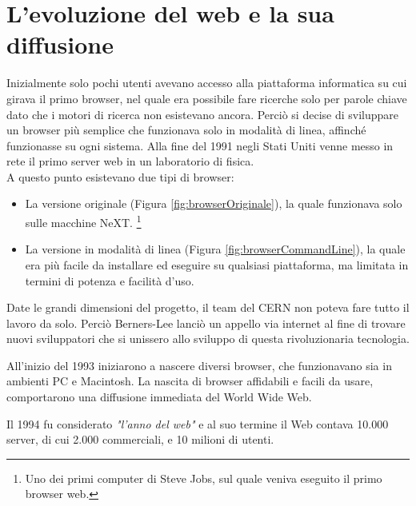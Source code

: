 \section{L'evoluzione del web e la sua diffusione}
Inizialmente solo pochi utenti avevano accesso alla piattaforma informatica su cui girava il primo browser, nel quale era possibile fare ricerche solo per parole chiave dato che i motori di ricerca non esistevano ancora. Perciò si decise di sviluppare un browser più semplice che funzionava solo in modalità di linea, affinché funzionasse su ogni sistema.
Alla fine del 1991 negli Stati Uniti venne messo in rete il primo server web in un laboratorio di fisica.\\
A questo punto esistevano due tipi di browser:
\begin{itemize}
    \item La versione originale (Figura \ref{fig:browserOriginale}), la quale funzionava solo sulle macchine NeXT. \footnote{Uno dei primi computer di Steve Jobs, sul quale veniva eseguito il primo browser web.}
    \item La versione in modalità di linea (Figura \ref{fig:browserCommandLine}), la quale era più facile da installare ed eseguire su qualsiasi piattaforma, ma limitata in termini di potenza e facilità d'uso.
\end{itemize}
Date le grandi dimensioni del progetto, il team del CERN non poteva fare tutto il lavoro da solo. Perciò Berners-Lee lanciò un appello via internet al fine di trovare nuovi sviluppatori che si unissero allo sviluppo di questa rivoluzionaria tecnologia.

All'inizio del 1993 iniziarono a nascere diversi browser, che funzionavano sia in ambienti PC e Macintosh. La nascita di browser affidabili e facili da usare, comportarono una diffusione immediata del World Wide Web.

Il 1994 fu considerato \textit{"l'anno del web"} e al suo termine il Web contava 10.000 server, di cui 2.000 commerciali, e 10 milioni di utenti.\cite{historyOfWeb}
\\

